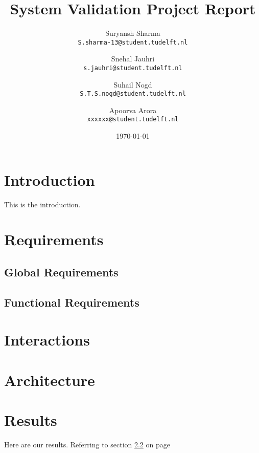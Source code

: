 \documentclass[a4paper,12pt]{article}
\begin{document}
\title{System Validation Project Report}
\author{
	Suryansh Sharma \\ 
	\texttt{S.sharma-13@student.tudelft.nl}
 	\and 
	Snehal Jauhri \\
	\texttt{s.jauhri@student.tudelft.nl} 
	\and
	Suhail Nogd \\
	\texttt{S.T.S.nogd@student.tudelft.nl} 	
	 \and 
	Apoorva Arora\\
	\texttt{xxxxxx@student.tudelft.nl} 
}

\date {\today}
\maketitle

\section{Introduction}
This is the introduction.

\section{Requirements}

\subsection{Global Requirements}
\label{sec1}

\subsection{Functional Requirements}
\label{sec1}

\section{Interactions} 

\section{Architecture}

\section{Results}
Here are our results. Referring to section \ref{sec1} on page \pageref{sec1}
\end{document}
